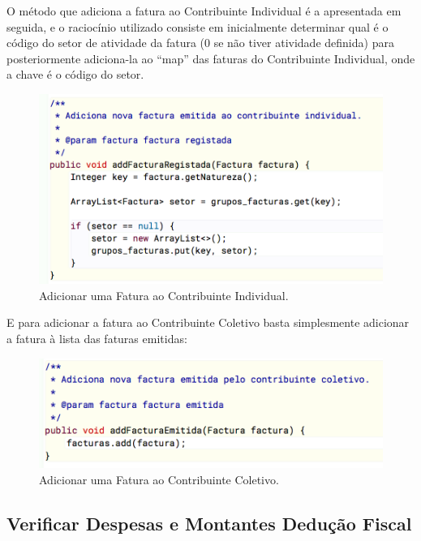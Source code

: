 \documentclass[a4paper]{article}
\begin{document}
\begin{itemize}
O método que adiciona a fatura ao Contribuinte Individual é a apresentada em seguida,
e o raciocínio utilizado consiste em inicialmente determinar qual é o código do setor
de atividade da fatura (0 se não tiver atividade definida) para posteriormente adiciona-la
ao ``map'' das faturas do Contribuinte Individual, onde a chave é o código do setor.

\begin{figure}[H]
\centering
\includegraphics[scale=0.40]{imgs/addFacturaRegistada.png}
\caption{Adicionar uma Fatura ao Contribuinte Individual.}
\label{img:addFacturaRegistada}
\end{figure}


E para adicionar a fatura ao Contribuinte Coletivo basta simplesmente
adicionar a fatura à lista das faturas emitidas:

\begin{figure}[H]
\centering
\includegraphics[scale=0.40]{imgs/addFacturaEmitida.png}
\caption{Adicionar uma Fatura ao Contribuinte Coletivo.}
\label{img:addFacturaEmitida}
\end{figure}


\subsection{Verificar Despesas e Montantes Dedução Fiscal}
\label{sec:despesasemontantes}


\end{itemize}
\end{document}
